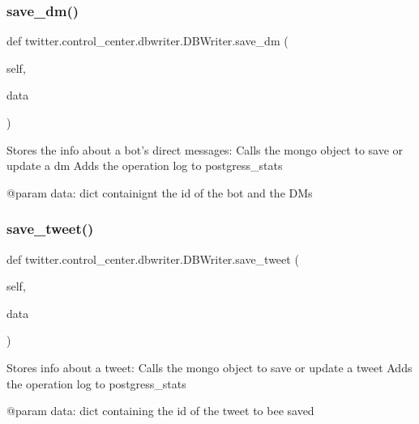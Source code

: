 \subsubsection{\texorpdfstring{save\+\_\+dm()}{save\_dm()}}
{\footnotesize\ttfamily def twitter.\+control\+\_\+center.\+dbwriter.\+D\+B\+Writer.\+save\+\_\+dm (\begin{DoxyParamCaption}\item[{}]{self,  }\item[{}]{data }\end{DoxyParamCaption})}

\begin{DoxyVerb}Stores the info about a bot's direct messages:
Calls the mongo object to save or update a dm
Adds the operation log to postgress_stats

@param data: dict containignt the id of the bot and the DMs
\end{DoxyVerb}
 \mbox{\label{classtwitter_1_1control__center_1_1dbwriter_1_1DBWriter_a0596d9924189129c588b6c603f462d5b}} 
\subsubsection{\texorpdfstring{save\+\_\+tweet()}{save\_tweet()}}
{\footnotesize\ttfamily def twitter.\+control\+\_\+center.\+dbwriter.\+D\+B\+Writer.\+save\+\_\+tweet (\begin{DoxyParamCaption}\item[{}]{self,  }\item[{}]{data }\end{DoxyParamCaption})}

\begin{DoxyVerb}Stores info about a tweet:
Calls the mongo object to save or update a tweet
Adds the operation log to postgress_stats

@param data: dict containing the id of the tweet to bee saved
\end{DoxyVerb}
 \mbox{\label{classtwitter_1_1control__center_1_1dbwriter_1_1DBWriter_a38708a33bd2b8019383571275b8a0f17}} 
